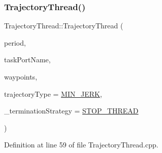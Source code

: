 \subsubsection{\texorpdfstring{Trajectory\+Thread()}{TrajectoryThread()}\hspace{0.1cm}{\footnotesize\ttfamily [2/3]}}
{\footnotesize\ttfamily Trajectory\+Thread\+::\+Trajectory\+Thread (\begin{DoxyParamCaption}\item[{int}]{period,  }\item[{const std\+::string \&}]{task\+Port\+Name,  }\item[{const Eigen\+::\+Matrix\+Xd \&}]{waypoints,  }\item[{const \hyperlink{namespaceocra__recipes_a729e1c8304e390d16219eda5f9756152}{T\+R\+A\+J\+E\+C\+T\+O\+R\+Y\+\_\+\+T\+Y\+PE}}]{trajectory\+Type = {\ttfamily \hyperlink{namespaceocra__recipes_a729e1c8304e390d16219eda5f9756152ad90eb95c7a6e37072c38d0f83980bff7}{M\+I\+N\+\_\+\+J\+E\+RK}},  }\item[{const \hyperlink{namespaceocra__recipes_afcf7ca623a6c39b246aa4bda629c7309}{T\+E\+R\+M\+I\+N\+A\+T\+I\+O\+N\+\_\+\+S\+T\+R\+A\+T\+E\+GY}}]{\+\_\+termination\+Strategy = {\ttfamily \hyperlink{namespaceocra__recipes_afcf7ca623a6c39b246aa4bda629c7309a0dc02a3e20f98a401113c91d7e6d4528}{S\+T\+O\+P\+\_\+\+T\+H\+R\+E\+AD}} }\end{DoxyParamCaption})}



Definition at line 59 of file Trajectory\+Thread.\+cpp.

\hypertarget{classocra__recipes_1_1TrajectoryThread_aabfcba1b3d2423f2217828331ee0eb40}{}\label{classocra__recipes_1_1TrajectoryThread_aabfcba1b3d2423f2217828331ee0eb40} 

